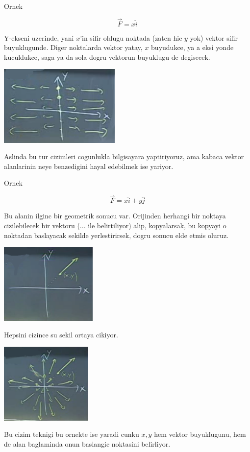 \documentclass[12pt,fleqn]{article}\usepackage{../common}
\begin{document}
Ornek

\[ \vec{F} = x\hat{i} \]

Y-ekseni uzerinde, yani $x$'in sifir oldugu noktada (zaten hic $y$ yok)
vektor sifir buyuklugunde. Diger noktalarda vektor yatay, $x$ buyudukce, ya
a eksi yonde kuculdukce, saga ya da sola dogru vektorun buyuklugu de
degisecek.

\includegraphics[height=4cm]{19_2.png}

Aslinda bu tur cizimleri cogunlukla bilgisayara yaptiriyoruz, ama kabaca
vektor alanlarinin neye benzedigini hayal edebilmek ise yariyor. 

Ornek

\[ \vec{F} = x\hat{i} + y\hat{j} \]

Bu alanin ilginc bir geometrik sonucu var.  Orijinden herhangi bir noktaya
cizilebilecek bir vektoru (... ile belirtiliyor) alip, kopyalarsak, bu
kopyayi o noktadan baslayacak sekilde yerlestirirsek, dogru sonucu elde
etmis oluruz.

\includegraphics[height=4cm]{19_3.png}

Hepsini cizince su sekil ortaya cikiyor. 

\includegraphics[height=4cm]{19_4.png}

Bu cizim teknigi bu ornekte ise yaradi cunku $x,y$ hem vektor buyuklugunu,
hem de alan baglaminda onun baslangic noktasini belirliyor. 
\end{document}

